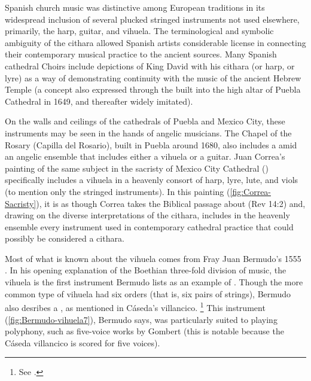 Spanish church music was distinctive among European traditions in its widespread inclusion of several plucked stringed instruments not used elsewhere, primarily, the harp, guitar, and vihuela. 
The terminological and symbolic ambiguity of the cithara allowed Spanish artists considerable license in connecting their contemporary musical practice to the ancient sources.
Many Spanish cathedral Choirs include depictions of King David with his cithara (or harp, or lyre) as a way of demonstrating continuity with the music of the ancient Hebrew Temple (a concept also expressed through the  built into the high altar of Puebla Cathedral in 1649, and thereafter widely imitated). 

On the walls and ceilings of the cathedrals of Puebla and Mexico City, these instruments may be seen in the hands of angelic musicians.
The Chapel of the Rosary (Capilla del Rosario), built in Puebla around 1680, also includes a  amid an angelic ensemble that includes either a vihuela or a guitar.
Juan Correa's painting of the same subject in the sacristy of Mexico City Cathedral () specifically includes a vihuela in a heavenly consort of harp, lyre, lute, and viols (to mention only the stringed instruments).
In this painting (\cref{fig:Correa-Sacristy}), it is as though Correa takes the Biblical passage about  (Rev 14:2) and, drawing on the diverse interpretations of the cithara, includes in the heavenly ensemble every instrument used in contemporary cathedral practice that could possibly be considered a cithara.



Most of what is known about the vihuela comes from Fray Juan Bermudo's 1555 %
	\autocite{Bermudo:Declaracion}.
In his opening explanation of the Boethian three-fold division of music, the vihuela is the first instrument Bermudo lists as an example of  .
Though the more common type of vihuela had six orders (that is, six pairs of strings), Bermudo also desribes a , as mentioned in Cáseda's villancico.%
	\footnote{%
	See \autocite[90v--110r]{Bermudo:Declaracion}.
	}
This instrument (\cref{fig:Bermudo-vihuela7}), Bermudo says, was particularly suited to playing polyphony, such as five-voice works by Gombert (this is notable because the Cáseda villancico is scored for five voices).

